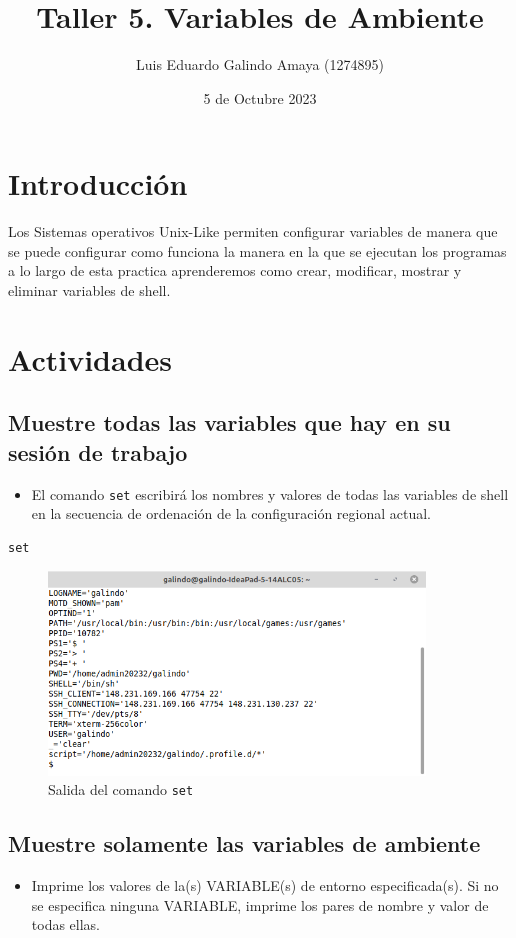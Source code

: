 \documentclass[11pt]{article}
\author{Luis Eduardo Galindo Amaya (1274895)}
\date{5 de Octubre 2023}
\title{Taller 5. Variables de Ambiente}
\begin{document}
\tableofcontents\pagebreak
{}


\section{Introducción}
\label{sec:orgce1d09b}
Los Sistemas operativos Unix-Like permiten configurar variables de manera que
se puede configurar como funciona la manera en la que se ejecutan los programas 
a lo largo de esta practica aprenderemos como crear, modificar, mostrar y 
eliminar variables de shell. 

\pagebreak

\section{Actividades}
\label{sec:org3515346}
\subsection{Muestre todas las variables que hay en su sesión de trabajo}
\label{sec:orgecd2917}
\begin{itemize}
\item \autocite{0001_P} El comando \texttt{set} escribirá los nombres y valores de todas las variables de shell en la secuencia de ordenación de la configuración regional actual.
\end{itemize}

\begin{verbatim}
set
\end{verbatim}

\begin{figure}[htbp]
\centering
\includegraphics[width=10cm]{img/1.png}
\caption[\texttt{set}]{Salida del comando \texttt{set}}
\end{figure}

\subsection{Muestre solamente las variables de ambiente}
\label{sec:orgeb49436}
\begin{itemize}
\item \autocite{0002_P} Imprime los valores de la(s) VARIABLE(s) de entorno especificada(s). Si no se especifica ninguna VARIABLE, imprime los pares de nombre y valor de todas ellas.
\end{itemize}
\end{document}
